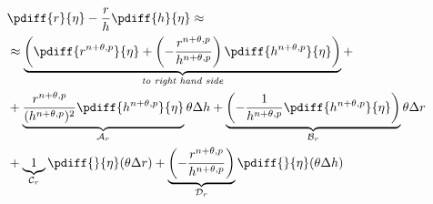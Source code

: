 %
\begin{align}
    &\pdiff{r}{\eta} - \frac{r}{h}\pdiff{h}{\eta}\approx
    \\*
    & \approx
    \underbrace{ \left( \pdiff{r^{n+\theta,p}}{\eta} + \left(- \frac{r^{n+\theta,p}}{h^{n+\theta,p}}\right) \pdiff{h^{n+\theta,p}}{\eta} \right)}_{\textit {to right hand side}} +
    \\*
    & + \underbrace{ \frac{r^{n+\theta,p}}{(h^{n+\theta,p})^2} \pdiff{h^{n+\theta,p}}{\eta} }_{{\cal{A}}_r}  \theta \Delta h
    + \underbrace{\left(-\frac{1}{h^{n+\theta,p}} \pdiff{h^{n+\theta,p}}{\eta} \right)}_{{\cal{B}}_r} \theta \Delta r
    \\*
    & +
    \underbrace{1}_{{\cal{C}}_r} \pdiff{}{\eta}(\theta \Delta r) +
    \underbrace{\left(-\frac{r^{n+\theta,p}}{h^{n+\theta,p}}\right)}_{{\cal{D}}_r}
    \pdiff{}{\eta}(\theta \Delta h)
\end{align}


